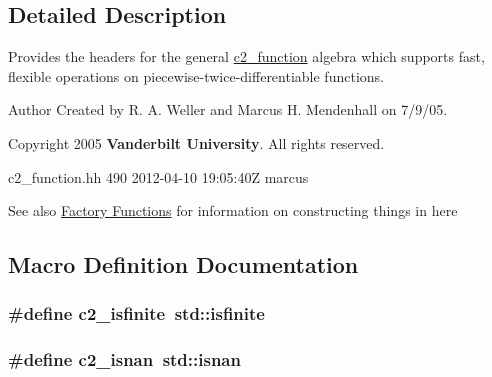 \subsection{Detailed Description}
Provides the headers for the general \hyperlink{classc2__function}{c2\+\_\+function} algebra which supports fast, flexible operations on piecewise-\/twice-\/differentiable functions. 

\begin{DoxyAuthor}{Author}
Created by R. A. Weller and Marcus H. Mendenhall on 7/9/05. 

Copyright 2005 {\bfseries Vanderbilt University}. All rights reserved. \begin{DoxyVerb}   \version c2_function.hh 490 2012-04-10 19:05:40Z marcus 
\end{DoxyVerb}
 
\end{DoxyAuthor}
\begin{DoxySeeAlso}{See also}
\hyperlink{classc2__factory}{Factory Functions} for information on constructing things in here 
\end{DoxySeeAlso}


\subsection{Macro Definition Documentation}
\subsubsection[{\texorpdfstring{c2\+\_\+isfinite}{c2_isfinite}}]{\setlength{\rightskip}{0pt plus 5cm}\#define c2\+\_\+isfinite~std\+::isfinite}\hypertarget{c2__function_8hh_a87bfb19e93b8b5a8d6f4467823e49358}{}\label{c2__function_8hh_a87bfb19e93b8b5a8d6f4467823e49358}
\subsubsection[{\texorpdfstring{c2\+\_\+isnan}{c2_isnan}}]{\setlength{\rightskip}{0pt plus 5cm}\#define c2\+\_\+isnan~std\+::isnan}\hypertarget{c2__function_8hh_a14afbcf351b849f9d6c93270e1209145}{}\label{c2__function_8hh_a14afbcf351b849f9d6c93270e1209145}
